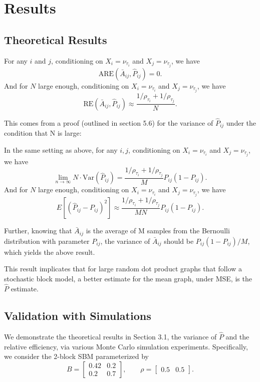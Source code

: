 \section{Results}
\subsection{Theoretical Results}

\begin{theorem}
\label{thm:ARE}
For any $i$ and $j$, conditioning on $X_i = \nu_{\tau_i}$ and $X_j = \nu_{\tau_j}$, we have
\[
	\mathrm{ARE}(\bar{A}_{ij}, \hat{P}_{ij}) = 0.
\]
And for $N$ large enough, conditioning on $X_i = \nu_{\tau_i}$ and $X_j = \nu_{\tau_j}$, we have
\[
	\mathrm{RE}(\bar{A}_{ij}, \hat{P}_{ij}) \approx
    \frac{1/\rho_{\tau_i} + 1/\rho_{\tau_j}}{N}.
\]
\end{theorem}
This comes from a proof (outlined in section 5.6) for the variance of $\hat{P}_{ij}$ under the condition that N is large:
\begin{lemma}
\label{lm:VarPhat}
In the same setting as above, for any $i, j$, conditioning on $X_i = \nu_{\tau_i}$ and $X_j = \nu_{\tau_j}$, we have
\[
	\lim_{n \to \infty} N \cdot \mathrm{Var}(\hat{P}_{ij}) =
    \frac{1/\rho_{\tau_i} + 1/\rho_{\tau_j}}{M} P_{ij} (1 - P_{ij}).
\]
And for $N$ large enough, conditioning on $X_i = \nu_{\tau_i}$ and $X_j = \nu_{\tau_j}$, we have
\[
	E[(\hat{P}_{ij} - P_{ij})^2] \approx
    \frac{1/\rho_{\tau_i} + 1/\rho_{\tau_j}}{M N} P_{ij}(1-P_{ij}).
\]
\end{lemma}
Further, knowing that $\bar{A}_{ij}$ is the average of M samples from the Bernoulli distribution with parameter $P_{ij}$, the variance of $\bar{A}_{ij}$ should be $P_{ij}(1-P_{ij})/M$, which yields the above result.

This result implicates that for large random dot product graphs that follow a stochastic block model, a better estimate for the mean graph, under MSE, is the $\hat{P}$ estimate.


\subsection{Validation with Simulations}
We demonstrate the theoretical results in Section 3.1, the variance of $\hat{P}$ and the relative efficiency, via various Monte Carlo simulation experiments. Specifically, we consider the 2-block SBM parameterized by
\begin{equation*}
B = \begin{bmatrix}
0.42 & 0.2 \\
0.2 & 0.7
\end{bmatrix}
,\qquad \rho = \begin{bmatrix}
0.5 & 0.5
\end{bmatrix}.
\end{equation*}

